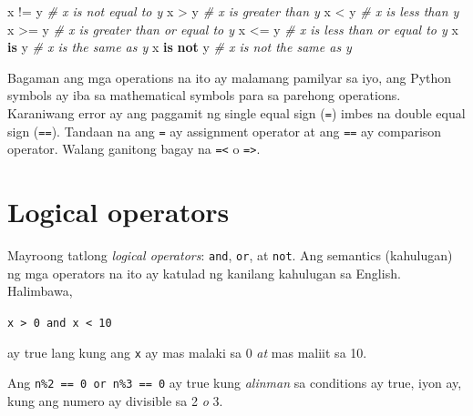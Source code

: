 \documentclass[10pt,]{book}
\newenvironment{Shaded}{}{}
\newcommand{\CommentTok}[1]{\textcolor[rgb]{0.38,0.63,0.69}{\textit{#1}}}
\newcommand{\KeywordTok}[1]{\textcolor[rgb]{0.00,0.44,0.13}{\textbf{#1}}}
\newcommand{\NormalTok}[1]{#1}
\newcommand{\OperatorTok}[1]{\textcolor[rgb]{0.40,0.40,0.40}{#1}}
\begin{document}
\begin{Shaded}
\begin{Highlighting}[]
\NormalTok{x }\OperatorTok{!=}\NormalTok{ y               }\CommentTok{\# x is not equal to y}
\NormalTok{x }\OperatorTok{\textgreater{}}\NormalTok{ y                }\CommentTok{\# x is greater than y}
\NormalTok{x }\OperatorTok{\textless{}}\NormalTok{ y                }\CommentTok{\# x is less than y}
\NormalTok{x }\OperatorTok{\textgreater{}=}\NormalTok{ y               }\CommentTok{\# x is greater than or equal to y}
\NormalTok{x }\OperatorTok{\textless{}=}\NormalTok{ y               }\CommentTok{\# x is less than or equal to y}
\NormalTok{x }\KeywordTok{is}\NormalTok{ y               }\CommentTok{\# x is the same as y}
\NormalTok{x }\KeywordTok{is} \KeywordTok{not}\NormalTok{ y           }\CommentTok{\# x is not the same as y}
\end{Highlighting}
\end{Shaded}

Bagaman ang mga operations na ito ay malamang pamilyar sa iyo, ang
Python symbols ay iba sa mathematical symbols para sa parehong
operations. Karaniwang error ay ang paggamit ng single equal sign
(\texttt{=}) imbes na double equal sign (\texttt{==}). Tandaan na ang
\texttt{=} ay assignment operator at ang \texttt{==} ay comparison
operator. Walang ganitong bagay na \texttt{=\textless{}} o
\texttt{=\textgreater{}}.

 

\section{Logical operators}\label{logical-operators}

 

Mayroong tatlong \emph{logical operators}: \texttt{and}, \texttt{or}, at
\texttt{not}. Ang semantics (kahulugan) ng mga operators na ito ay
katulad ng kanilang kahulugan sa English. Halimbawa,

\texttt{x\ \textgreater{}\ 0\ and\ x\ \textless{}\ 10}

ay true lang kung ang \texttt{x} ay mas malaki sa 0 \emph{at} mas maliit
sa 10.

  
  

Ang \texttt{n\%2\ ==\ 0\ or\ n\%3\ ==\ 0} ay true kung \emph{alinman} sa
conditions ay true, iyon ay, kung ang numero ay divisible sa 2 \emph{o}
3.
\end{document}

